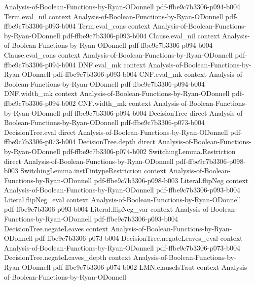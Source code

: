\begin{theorem}
  {Analysis-of-Boolean-Functions-by-Ryan-ODonnell}
  {pdf-ffbe9c7b3306-p094-b004}
\proofstep
  {Term.eval_nil}
  {context}
  {Analysis-of-Boolean-Functions-by-Ryan-ODonnell}
  {pdf-ffbe9c7b3306-p093-b004}
\proofstep
  {Term.eval_cons}
  {context}
  {Analysis-of-Boolean-Functions-by-Ryan-ODonnell}
  {pdf-ffbe9c7b3306-p093-b004}
\proofstep
  {Clause.eval_nil}
  {context}
  {Analysis-of-Boolean-Functions-by-Ryan-ODonnell}
  {pdf-ffbe9c7b3306-p094-b004}
\proofstep
  {Clause.eval_cons}
  {context}
  {Analysis-of-Boolean-Functions-by-Ryan-ODonnell}
  {pdf-ffbe9c7b3306-p094-b004}
\proofstep
  {DNF.eval_mk}
  {context}
  {Analysis-of-Boolean-Functions-by-Ryan-ODonnell}
  {pdf-ffbe9c7b3306-p093-b004}
\proofstep
  {CNF.eval_mk}
  {context}
  {Analysis-of-Boolean-Functions-by-Ryan-ODonnell}
  {pdf-ffbe9c7b3306-p094-b004}
\proofstep
  {DNF.width_mk}
  {context}
  {Analysis-of-Boolean-Functions-by-Ryan-ODonnell}
  {pdf-ffbe9c7b3306-p094-b002}
\proofstep
  {CNF.width_mk}
  {context}
  {Analysis-of-Boolean-Functions-by-Ryan-ODonnell}
  {pdf-ffbe9c7b3306-p094-b004}
\proofstep
  {DecisionTree}
  {direct}
  {Analysis-of-Boolean-Functions-by-Ryan-ODonnell}
  {pdf-ffbe9c7b3306-p073-b004}
\proofstep
  {DecisionTree.eval}
  {direct}
  {Analysis-of-Boolean-Functions-by-Ryan-ODonnell}
  {pdf-ffbe9c7b3306-p073-b004}
\proofstep
  {DecisionTree.depth}
  {direct}
  {Analysis-of-Boolean-Functions-by-Ryan-ODonnell}
  {pdf-ffbe9c7b3306-p074-b002}
\proofstep
  {SwitchingLemma.Restriction}
  {direct}
  {Analysis-of-Boolean-Functions-by-Ryan-ODonnell}
  {pdf-ffbe9c7b3306-p098-b003}
\proofstep
  {SwitchingLemma.instFintypeRestriction}
  {context}
  {Analysis-of-Boolean-Functions-by-Ryan-ODonnell}
  {pdf-ffbe9c7b3306-p098-b003}
\proofstep
  {Literal.flipNeg}
  {context}
  {Analysis-of-Boolean-Functions-by-Ryan-ODonnell}
  {pdf-ffbe9c7b3306-p093-b004}
\proofstep
  {Literal.flipNeg_eval}
  {context}
  {Analysis-of-Boolean-Functions-by-Ryan-ODonnell}
  {pdf-ffbe9c7b3306-p093-b004}
\proofstep
  {Literal.flipNeg_var}
  {context}
  {Analysis-of-Boolean-Functions-by-Ryan-ODonnell}
  {pdf-ffbe9c7b3306-p093-b004}
\proofstep
  {DecisionTree.negateLeaves}
  {context}
  {Analysis-of-Boolean-Functions-by-Ryan-ODonnell}
  {pdf-ffbe9c7b3306-p073-b004}
\proofstep
  {DecisionTree.negateLeaves_eval}
  {context}
  {Analysis-of-Boolean-Functions-by-Ryan-ODonnell}
  {pdf-ffbe9c7b3306-p073-b004}
\proofstep
  {DecisionTree.negateLeaves_depth}
  {context}
  {Analysis-of-Boolean-Functions-by-Ryan-ODonnell}
  {pdf-ffbe9c7b3306-p074-b002}
\proofstep
  {LMN.clauseIsTaut}
  {context}
  {Analysis-of-Boolean-Functions-by-Ryan-ODonnell}

\end{theorem}
